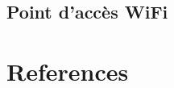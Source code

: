 \documentclass[11pt,serif,mathserif,compress,hyperref={colorlinks}]{beamer}
\begin{document}
\subsection{Point d'accès WiFi}

\subsection{}

\subsection{}


\section{References}
\end{document}
